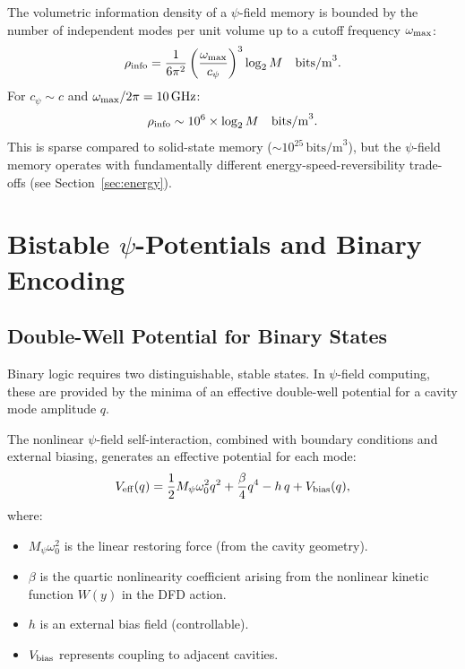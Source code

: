 \documentclass[12pt,a4paper,twoside]{article}
\begin{document}
The volumetric information density of a $\psi$-field memory is bounded by the number of independent modes per unit volume up to a cutoff frequency $\omega_{\rm max}$:
\begin{equation}
\rho_{\rm info} = \frac{1}{6\pi^2}\left(\frac{\omega_{\rm max}}{c_\psi}\right)^3 \log_2 M \quad \text{bits/m}^3.
\label{eq:info_density}
\end{equation}
For $c_\psi \sim c$ and $\omega_{\rm max}/2\pi = 10\,\si{GHz}$:
\begin{equation}
\rho_{\rm info} \sim 10^6 \times \log_2 M \quad \text{bits/m}^3.
\end{equation}
This is sparse compared to solid-state memory ($\sim 10^{25}\,\text{bits/m}^3$), but the $\psi$-field memory operates with fundamentally different energy-speed-reversibility trade-offs (see Section~\ref{sec:energy}).

\section{Bistable $\psi$-Potentials and Binary Encoding}\label{sec:bistable}

\subsection{Double-Well Potential for Binary States}\label{sec:double_well}

Binary logic requires two distinguishable, stable states. In $\psi$-field computing, these are provided by the minima of an effective double-well potential for a cavity mode amplitude $q$.

The nonlinear $\psi$-field self-interaction, combined with boundary conditions and external biasing, generates an effective potential for each mode:
\begin{equation}
V_{\rm eff}(q) = \frac{1}{2}M_\psi \omega_0^2 q^2 + \frac{\beta}{4}q^4 - h\,q + V_{\rm bias}(q),
\label{eq:double_well}
\end{equation}
where:
\begin{itemize}
\item $M_\psi \omega_0^2$ is the linear restoring force (from the cavity geometry).
\item $\beta$ is the quartic nonlinearity coefficient arising from the nonlinear kinetic function $W(y)$ in the DFD action.
\item $h$ is an external bias field (controllable).
\item $V_{\rm bias}$ represents coupling to adjacent cavities.
\end{itemize}
\end{document}
